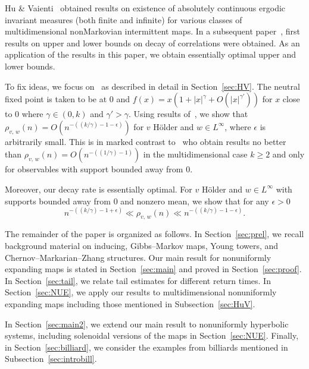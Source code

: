 \documentclass[AHL,Unicode,longabstracts,published]{cedram}
\newcommand{\eps}{\epsilon}
\begin{document}
Hu \& Vaienti~\cite{HuVaienti09} obtained results on existence of absolutely continuous ergodic invariant measures (both finite and infinite) for various classes of multidimensional nonMarkovian intermittent maps. In a subsequent paper~\cite{HuVaientiapp}, first results on upper and lower bounds on decay of correlations were obtained. As an application of the results in this paper, we obtain essentially optimal upper and lower bounds.

To fix ideas, we focus on~\cite[Example~5.1]{HuVaientiapp} as described in detail in Section~\ref{sec:HV}. The neutral fixed point is taken to be at $0$ and $f(x)=x(1+|x|^\gamma+O(|x|^{\gamma'}))$ for $x$ close to $0$ where $\gamma\in(0,k)$ and $\gamma'>\gamma$. Using results of~\cite{AFLV11,HuVaienti09}, we show that $\rho_{v,\,w}(n)=O(n^{-((k/\gamma)-1-\eps)})$ for $v$ H\"older and $w\in L^\infty$, where $\eps$ is arbitrarily small. This is in marked contrast to~\cite{HuVaientiapp} who obtain results no better than $\rho_{v,\,w}(n)=O(n^{-((1/\gamma)-1)})$ in the multidimensional case $k\ge2$ and only for observables with support bounded away from $0$.

Moreover, our decay rate is essentially optimal. For $v$ H\"older and $w\in L^\infty$ with supports bounded away from $0$ and nonzero mean, we show that for any $\eps>0$
\begin{equation}\label{eq:HV}
n^{-((k/\gamma)-1+\eps)}\ll \rho_{v,\,w}(n)\ll n^{-((k/\gamma)-1-\eps)}.
\end{equation}



The remainder of the paper is organized as follows. In Section~\ref{sec:prel}, we recall background material on inducing, Gibbs--Markov maps, Young towers, and Chernov--Markarian--Zhang structures. Our main result for nonuniformly expanding maps is stated in Section~\ref{sec:main} and proved in Section~\ref{sec:proof}. In Section~\ref{sec:tail}, we relate tail estimates for different return times. In Section~\ref{sec:NUE}, we apply our results to multidimensional nonuniformly expanding maps including those mentioned in Subsection~\ref{sec:HuV}.

In Section~\ref{sec:main2}, we extend our main result to nonuniformly hyperbolic systems, including solenoidal versions of the maps in Section~\ref{sec:NUE}. Finally, in Section~\ref{sec:billiard}, we consider the examples from billiards mentioned in Subsection~\ref{sec:introbill}.
\end{document}
